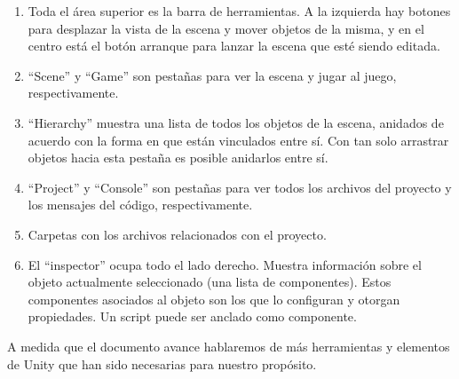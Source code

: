 \begin{enumerate}
\item Toda el área superior es la barra de herramientas. A la izquierda hay botones para desplazar la vista de la escena y mover objetos de la misma, y en el centro está el botón arranque para lanzar la escena que esté siendo editada.
\item ``Scene'' y ``Game'' son pestañas para ver la escena y jugar al juego, respectivamente.
\item ``Hierarchy'' muestra una lista de todos los objetos de la escena, anidados de acuerdo con la forma en que están vinculados entre sí. Con tan solo arrastrar objetos hacia esta pestaña es posible anidarlos entre sí.
\item ``Project'' y ``Console'' son pestañas para ver todos los archivos del proyecto y los mensajes del código, respectivamente.
\item Carpetas con los archivos relacionados con el proyecto.
\item El ``inspector'' ocupa todo el lado derecho. Muestra información sobre el objeto actualmente seleccionado (una lista de componentes). Estos componentes asociados al objeto son los que lo configuran y otorgan propiedades. Un script puede ser anclado como componente.
\end{enumerate}

A medida que el documento avance hablaremos de más herramientas y elementos de Unity que han sido necesarias para nuestro propósito.